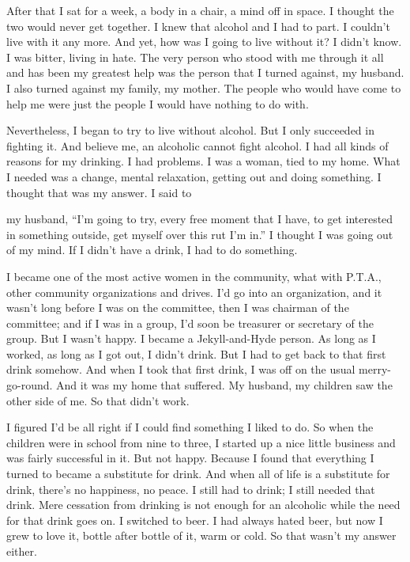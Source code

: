 \begin{biblechapter}
After that I sat for a week, a body in a chair, a mind off in space. I thought the two would never get together. I knew that alcohol and I had to part. I couldn’t live with it any more. And yet, how was I going to live without it? I didn’t know. I was bitter, living in hate. The very person who stood with me through it all and has been my greatest help was the person that I turned against, my husband. I also turned against my family, my mother. The people who would have come to help me were just the people I would have nothing to do with.

Nevertheless, I began to try to live without alcohol. But I only succeeded in fighting it. And believe me, an alcoholic cannot fight alcohol. I had all kinds of reasons for my drinking. I had problems. I was a woman, tied to my home. What I needed was a change, mental relaxation, getting out and doing something. I thought that was my answer. I said to

my husband, “I’m going to try, every free moment that I have, to get interested in something outside, get myself over this rut I’m in.” I thought I was going out of my mind. If I didn’t have a drink, I had to do something.

I became one of the most active women in the community, what with P.T.A., other community organizations and drives. I’d go into an organization, and it wasn’t long before I was on the committee, then I was chairman of the committee; and if I was in a group, I’d soon be treasurer or secretary of the group. But I wasn’t happy. I became a Jekyll-and-Hyde person. As long as I worked, as long as I got out, I didn’t drink. But I had to get back to that first drink somehow. And when I took that first drink, I was off on the usual merry-go-round. And it was my home that suffered. My husband, my children saw the other side of me. So that didn’t work.

I figured I’d be all right if I could find something I liked to do. So when the children were in school from nine to three, I started up a nice little business and was fairly successful in it. But not happy. Because I found that everything I turned to became a substitute for drink. And when all of life is a substitute for drink, there’s no happiness, no peace. I still had to drink; I still needed that drink. Mere cessation from drinking is not enough for an alcoholic while the need for that drink goes on. I switched to beer. I had always hated beer, but now I grew to love it, bottle after bottle of it, warm or cold. So that wasn’t my answer either.


\end{biblechapter}
